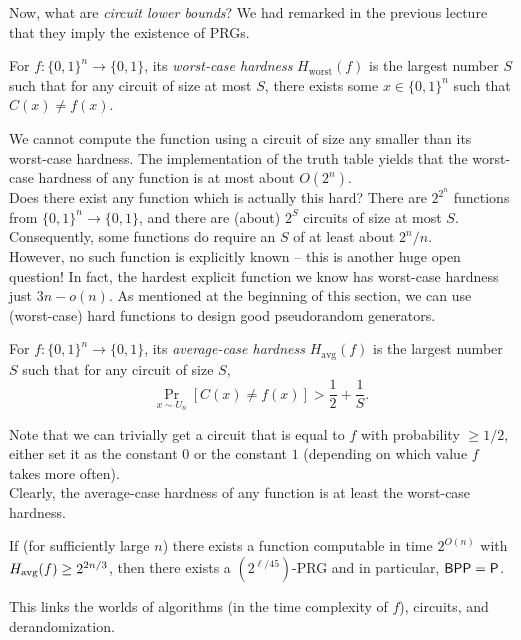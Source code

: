 		Now, what are \emph{circuit lower bounds}? We had remarked in the previous lecture that they imply the existence of PRGs.

		\begin{fdef}
			For $f : \{0,1\}^n \to \{0,1\}$, its \emph{worst-case hardness} $H_\text{worst}(f)$ is the largest number $S$ such that for any circuit of size at most $S$, there exists some $x \in \{0,1\}^n$ such that $C(x) \ne f(x)$. 
		\end{fdef}
		We cannot compute the function using a circuit of size any smaller than its worst-case hardness. The implementation of the truth table yields that the worst-case hardness of any function is at most about $O(2^n)$. \\
		
		Does there exist any function which is actually this hard? There are $2^{2^n}$ functions from $\{0,1\}^n \to \{0,1\}$, and there are (about) $2^S$ circuits of size at most $S$. Consequently, some functions do require an $S$ of at least about $2^n/n$.\\
		However, no such function is explicitly known -- this is another huge open question! In fact, the hardest explicit function we know has worst-case hardness just $3n - o(n)$. %
		As mentioned at the beginning of this section, we can use (worst-case) hard functions to design good pseudorandom generators.

		\begin{fdef}
			For $f : \{0,1\}^n \to \{0,1\}$, its \emph{average-case hardness} $H_\text{avg}(f)$ is the largest number $S$ such that for any circuit of size $S$,
			\[ \Pr_{x \sim U_n} \left[ C(x) \ne f(x) \right] > \frac{1}{2} + \frac{1}{S}. \]
		\end{fdef}
		Note that we can trivially get a circuit that is equal to $f$ with probability $\ge 1/2$, either set it as the constant $0$ or the constant $1$ (depending on which value $f$ takes more often).\\
		Clearly, the average-case hardness of any function is at least the worst-case hardness.

		\begin{ftheo}
			\label{theo: hard to prg}
			If (for sufficiently large $n$) there exists a function computable in time $2^{O(n)}$ with $H_{\text{avg}}(f) \ge 2^{2n/3}$, then there exists a $(2^{\ell/45})$-PRG and in particular, $\mathsf{BPP} = \mathsf{P}$.
		\end{ftheo}
		This links the worlds of algorithms (in the time complexity of $f$), circuits, and derandomization.\\

